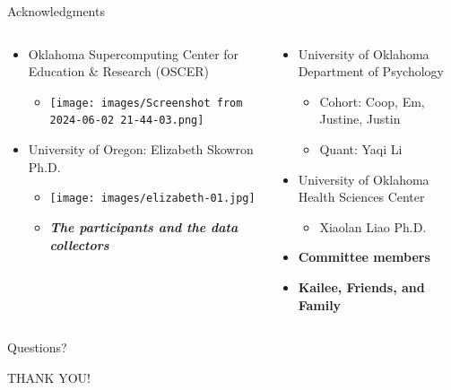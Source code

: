 \documentclass[
  ignorenonframetext,
]{beamer}
\providecommand{\tightlist}{%
  \setlength{\itemsep}{0pt}\setlength{\parskip}{0pt}}
\begin{document}
\begin{frame}{Acknowledgments}
\label{acknowledgments}
\begin{columns}[T]
\begin{column}{0.5\textwidth}
\begin{itemize}
\item
  Oklahoma Supercomputing Center for Education \& Research (OSCER)

  \begin{itemize}
  \tightlist
  \item
    \texttt{[image: images/Screenshot from 2024-06-02 21-44-03.png]}
  \end{itemize}
\item
  University of Oregon: Elizabeth Skowron Ph.D.

  \begin{itemize}
  \tightlist
  \item
    \texttt{[image: images/elizabeth-01.jpg]}
  \item
    \textbf{\emph{The participants and the data collectors}}
  \end{itemize}
\end{itemize}
\end{column}

\begin{column}{0.5\textwidth}
\begin{itemize}
\item
  University of Oklahoma Department of Psychology

  \begin{itemize}
  \tightlist
  \item
    Cohort: Coop, Em, Justine, Justin
  \item
    Quant: Yaqi Li
  \end{itemize}
\item
  University of Oklahoma Health Sciences Center

  \begin{itemize}
  \tightlist
  \item
    Xiaolan Liao Ph.D.
  \end{itemize}
\item
  \textbf{Committee members}
\item
  \textbf{Kailee, Friends, and Family}
\end{itemize}
\end{column}
\end{columns}
\end{frame}

\begin{frame}{Questions?}
\label{questions}
\begin{block}{THANK YOU!}
\label{thank-you}
\end{block}
\end{frame}
\end{document}
